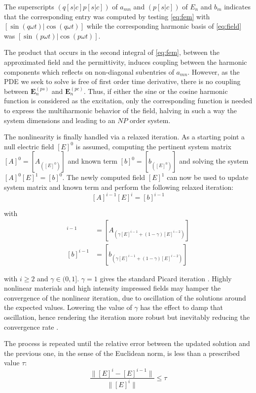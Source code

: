 \documentclass[journal]{IEEEtran}
\renewcommand{\vec}[1]{\mathbf{#1}}
\begin{document}
\noindent The superscripts $(q[s|c]p[s|c])$ of $a_{mn}$ and
$(p[s|c])$ of $E_n$ and $b_m$ indicates that the corresponding
entry was computed by testing \eqref{eq:fem} with $[\sin(q \omega t) | \cos(q \omega t)]$ 
while the corresponding harmonic basis of \eqref{eq:field}
was $[\sin(p \omega t) | \cos(p \omega t)]$.

The product that occurs in the second integral of \eqref{eq:fem}, between the
approximated field and the permittivity, induces coupling between the harmonic
components which reflects on non-diagonal subentries of $a_{mn}$. 
However, as the PDE we seek to solve is free of first order time derivative, there is no 
coupling between $\vec{E}_{n}^{(ps)}$ and $\vec{E}_{n}^{(pc)}$. Thus, if either the 
sine or the cosine harmonic function is considered as the excitation, only the corresponding
function is needed to express the multiharmonic behavior of the 
field, halving in such a way the system dimensions and leading to an $NP$ order
system.

The nonlinearity is finally handled via a
relaxed iteration. As a starting point a null electric field $[E]^0$ is assumed,
computing the pertinent system matrix $[A]^0=[A_{([E]^0)}]$ and
known term $[b]^0=[b_{([E]^0)}]$ and solving the system $[A]^0 [E]^1 =
[b]^0$. The newly computed field $[E]^1$ can now be used to update system
matrix and known term and perform the following relaxed iteration:
%
\begin{equation} \label{eq:lastLinearSystem}
[A]^{i-1} [E]^{i} = [b]^{i-1}
\end{equation}

\noindent with 
%
\begin{align}
[A]^{i-1} &= [A_{(\gamma [E]^{i-1} + (1-\gamma) [E]^{i-2})}] \\
[b]^{i-1} &= [b_{(\gamma [E]^{i-1} + (1-\gamma) [E]^{i-2})}]
\end{align}

\noindent with $i \geq 2$ and
$\gamma\in(0,1]$. $\gamma=1$ gives the standard Picard iteration \cite{Guarnieri2010}. 
Highly nonlinear materials and high intensity impressed fields may hamper the convergence
of the nonlinear iteration, due to oscillation of the solutions around the expected values. 
Lowering the value of $\gamma$ has the effect to damp that oscillation, hence rendering the
iteration more robust but inevitably reducing the convergence rate \cite{Silvester1997}.

The process is repeated until the relative error between the updated solution
and the previous one, in the sense of the Euclidean norm, is less than a
prescribed value $\tau$:
%
\begin{equation}
\frac{\|[E]^{i} - [E]^{i-1} \|}{\| [E]^{i} \|} \leq \tau
\end{equation}
\end{document}
